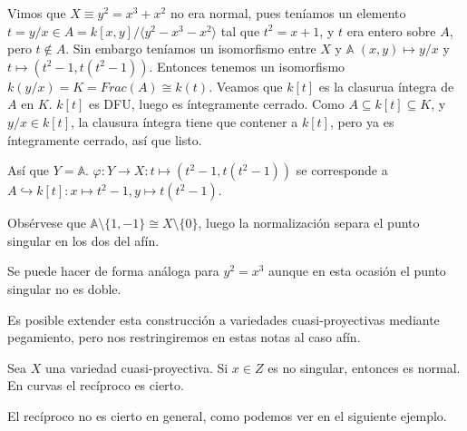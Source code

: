 \documentclass[ACGA.tex]{subfiles}
\begin{document}
\begin{ejs}
Vimos que $X\equiv y^2=x^3+x^2$ no era normal, pues teníamos un elemento $t=y/x\in A=k[x,y]/\langle y^2-x^3-x^2\rangle$ tal que $t^2=x+1$, y $t$ era entero sobre $A$, pero $t\notin A$. Sin embargo teníamos un isomorfismo entre $X$ y $\mathbb{A}$ $(x,y)\mapsto y/x$ y $t\mapsto (t^2-1,t(t^2-1))$. Entonces tenemos un isomorfismo $k(y/x)=K=Frac(A)\cong k(t)$.  Veamos que $k[t]$ es la clasurua íntegra de $A$ en $K$. $k[t]$ es DFU, luego es íntegramente cerrado. Como $A\subseteq k[t]\subseteq K$, y $y/x\in k[t]$, la clausura íntegra tiene que contener a $k[t]$, pero ya es íntegramente cerrado, así que listo.

Así que $Y=\mathbb{A}$. $\varphi: Y\to X: t\mapsto (t^2-1,t(t^2-1))$ se corresponde a $A\hookrightarrow k[t]: x\mapsto t^2-1, y\mapsto t(t^2-1)$. 

Obsérvese que $\mathbb{A}\setminus\{1,-1\}\cong X\setminus\{0\}$, luego la normalización separa el punto singular en los dos del afín. 

Se puede hacer de forma análoga para $y^2=x^3$ aunque en esta ocasión el punto singular no es doble.
\end{ejs}

Es posible extender esta construcción a variedades cuasi-proyectivas mediante pegamiento, pero nos restringiremos en estas notas al caso afín.

\begin{prop}
Sea $X$ una variedad cuasi-proyectiva. Si $x\in Z$ es no singular, entonces es normal. En curvas el recíproco es cierto.
\end{prop}

El recíproco no es cierto en general, como podemos ver en el siguiente ejemplo.
\end{document}
